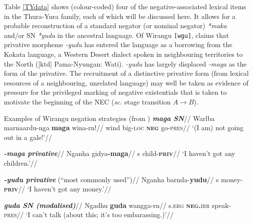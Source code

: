 Table \ref{TYdata} shows (colour-coded) four of the negative-associated lexical items in the Thura-Yura family, each of which will be discussed here. It allows for a probable reconstruction of a standard negator (or nominal negator) \textit{*maka} and/or SN \textit{*guda} in the ancestral language. Of Wirangu \texttt{[wgu]}, \citet[57]{Hercus1999} claims that privative morpheme \textit{-yudu} has entered the language as a borrowing from the Kokata language, a Western Desert dialect spoken in neighbouring territories to the North ([\gls{ktd}] Pama-Nyungan: Wati). \textit{-yudu} has largely displaced \textit{-maga} as the form of the privative. The recruitment of a distinctive privative form (from lexical resources of a neighbouring, unrelated language) may well be taken as evidence of pressure for the privileged marking of negative existentials that is taken to motivate the beginning of the NEC (\textit{sc.} stage transition $A\to B$).



\pex Examples of Wirangu negation strategies (from \citealt{Hercus1999})\label{wgu-exx}
\a\begingl\glpreamble \textbf{\em{maga} SN}//
\gla Warlba marnaardu-nga \textbf{maga} wina-rn!//
\glb wind big\textsc{-loc} \textsc{\textbf{neg}} go\textsc{-pres}//
\glft `(I am) not going out in a gale!'//\endgl

\a\begingl\glpreamble \textbf{\em{-maga} privative}//
\gla Nganha gidya\textbf{-maga}//
\gls{s} child-\textsc{\textbf{priv}}//
\glft`I haven't got any children.'//\endgl

\a\begingl
\glpreamble\textbf{ \em{-yudu} privative }(``most commonly used'')//
\gla Nganha barnda-\textbf{yudu}//
\gls{s} money-\textsc{\textbf{priv}}//
\glft`I haven't got any money.'//\endgl

\a\begingl\glpreamble \textbf{\em{guda} SN (modalised)}//
\gla Ngadhu \textbf{guda} wangga-rn//
\gls{s}.\textsc{erg} \textsc{\textbf{neg.}irr} speak\textsc{-pres}//
\glft`I can't talk (about this; it's too embarassing.)'//\endgl
\xe


